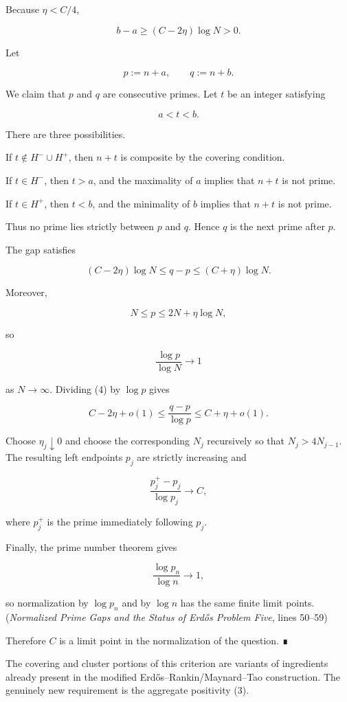 Because \(\eta<C/4\),

\[
b-a\ge(C-2\eta)\log N>0.
\]

Let

\[
p:=n+a,\qquad q:=n+b.
\]

We claim that \(p\) and \(q\) are consecutive primes. Let \(t\) be an integer satisfying

\[
a<t<b.
\]

There are three possibilities.

If \(t\notin H^-\cup H^+\), then \(n+t\) is composite by the covering condition.

If \(t\in H^-\), then \(t>a\), and the maximality of \(a\) implies that \(n+t\) is not prime.

If \(t\in H^+\), then \(t<b\), and the minimality of \(b\) implies that \(n+t\) is not prime.

Thus no prime lies strictly between \(p\) and \(q\). Hence \(q\) is the next prime after \(p\).

The gap satisfies

\[
(C-2\eta)\log N
\le q-p
\le(C+\eta)\log N.
\tag{4}
\]

Moreover,

\[
N\le p\le2N+\eta\log N,
\]

so

\[
\frac{\log p}{\log N}\longrightarrow1
\]

as \(N\to\infty\). Dividing (4) by \(\log p\) gives

\[
C-2\eta+o(1)
\le
\frac{q-p}{\log p}
\le
C+\eta+o(1).
\]

Choose \(\eta_j\downarrow0\) and choose the corresponding \(N_j\) recursively so that \(N_j>4N_{j-1}\). The resulting left endpoints \(p_j\) are strictly increasing and

\[
\frac{p_j^+-p_j}{\log p_j}\longrightarrow C,
\]

where \(p_j^+\) is the prime immediately following \(p_j\).

Finally, the prime number theorem gives

\[
\frac{\log p_n}{\log n}\longrightarrow1,
\]

so normalization by \(\log p_n\) and by \(\log n\) has the same finite limit points. (\textit{Normalized Prime Gaps and the Status of Erd\H{o}s Problem Five}, lines 50--59)

Therefore \(C\) is a limit point in the normalization of the question. ∎

The covering and cluster portions of this criterion are variants of ingredients already present in the modified Erdős–Rankin/Maynard–Tao construction. The genuinely new requirement is the aggregate positivity (3).

